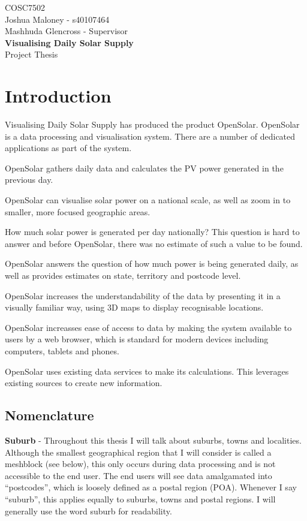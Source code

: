 \documentclass[12pt,a4paper]{report}
\makeatletter
\newcommand*{\toccontents}{\@starttoc{toc}}
\makeatother
\begin{document}
\begin{center}
COSC7502 \\
Joshua Maloney - s40107464 \\
Mashhuda Glencross - Supervisor \\
\Large\textbf{Visualising Daily Solar Supply} \\
Project Thesis \\
\end{center}


\toccontents


\section{Introduction}

Visualising Daily Solar Supply has produced the product OpenSolar. OpenSolar is a data processing and visualisation system. There are a number of dedicated applications as part of the system.

OpenSolar gathers daily data and calculates the PV power generated in the previous day.

OpenSolar can visualise solar power on a national scale, as well as zoom in to smaller, more focused geographic areas.

How much solar power is generated per day nationally? This question is hard to answer and before OpenSolar, there was no estimate of such a value to be found.

OpenSolar answers the question of how much power is being generated daily, as well as provides estimates on state, territory and postcode level.

OpenSolar increases the understandability of the data by presenting it in a visually familiar way, using 3D maps to display recognisable locations.

OpenSolar increasses ease of access to data by making the system available to users by a web browser, which is standard for modern devices including computers, tablets and phones.

OpenSolar uses existing data services to make its calculations. This leverages existing sources to create new information.

\subsection{Nomenclature}

\textbf{Suburb} - Throughout this thesis I will talk about suburbs, towns and localities. Although the smallest geographical region that I will consider is called a meshblock (see below), this only occurs during data processing and is not accessible to the end user. The end users will see data amalgamated into ``postcodes'', which is loosely defined as a postal region (POA). Whenever I say ``suburb'', this applies equally to suburbs, towns and postal regions.  I will generally use the word suburb for readability.
\end{document}
